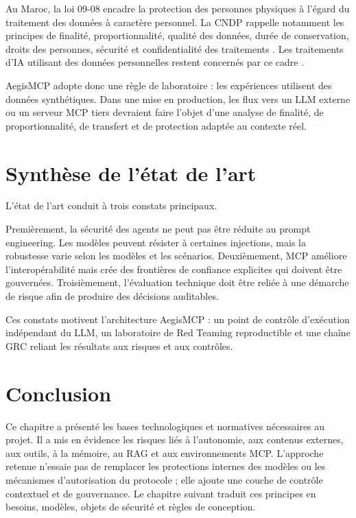 Au Maroc, la loi 09-08 encadre la protection des personnes physiques à l'égard du traitement des données à caractère personnel. La CNDP rappelle notamment les principes de finalité, proportionnalité, qualité des données, durée de conservation, droits des personnes, sécurité et confidentialité des traitements \cite{cndp0908,cndpconditions}. Les traitements d'IA utilisant des données personnelles restent concernés par ce cadre \cite{cndpai}.

AegisMCP adopte donc une règle de laboratoire : les expériences utilisent des données synthétiques. Dans une mise en production, les flux vers un LLM externe ou un serveur MCP tiers devraient faire l'objet d'une analyse de finalité, de proportionnalité, de transfert et de protection adaptée au contexte réel.

\section{Synthèse de l'état de l'art}

L'état de l'art conduit à trois constats principaux.

Premièrement, la sécurité des agents ne peut pas être réduite au prompt engineering. Les modèles peuvent résister à certaines injections, mais la robustesse varie selon les modèles et les scénarios. Deuxièmement, MCP améliore l'interopérabilité mais crée des frontières de confiance explicites qui doivent être gouvernées. Troisièmement, l'évaluation technique doit être reliée à une démarche de risque afin de produire des décisions auditables.

Ces constats motivent l'architecture AegisMCP : un point de contrôle d'exécution indépendant du LLM, un laboratoire de Red Teaming reproductible et une chaîne GRC reliant les résultats aux risques et aux contrôles.

\section*{Conclusion}

Ce chapitre a présenté les bases technologiques et normatives nécessaires au projet. Il a mis en évidence les risques liés à l'autonomie, aux contenus externes, aux outils, à la mémoire, au RAG et aux environnements MCP. L'approche retenue n'essaie pas de remplacer les protections internes des modèles ou les mécanismes d'autorisation du protocole ; elle ajoute une couche de contrôle contextuel et de gouvernance. Le chapitre suivant traduit ces principes en besoins, modèles, objets de sécurité et règles de conception.

